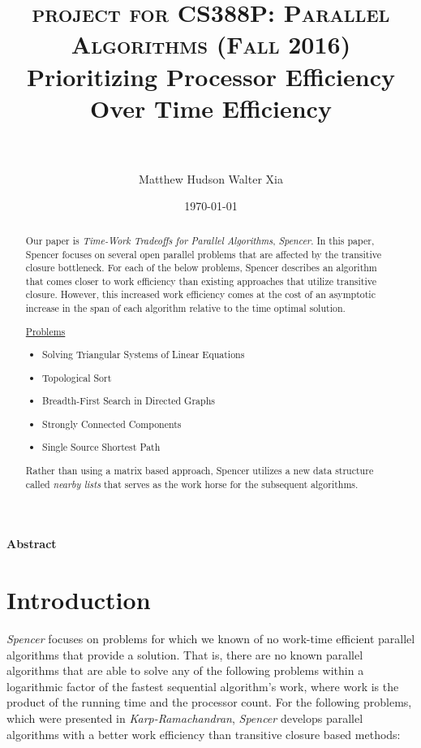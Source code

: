 \documentclass[paper=a4, fontsize=11pt]{scrartcl} %
\title{	
\normalfont \normalsize 
\textsc{project for CS388P: Parallel Algorithms (Fall 2016)} 
\horrule{0.5pt} \\[0.4cm] %
\huge Prioritizing Processor Efficiency Over Time Efficiency \\ %
\horrule{2pt} \\[0.5cm] %
}
\author{Matthew Hudson \hspace{5mm} Walter Xia }	%
\date{\normalsize\today} %
\numberwithin{equation}{section} %
\numberwithin{figure}{section} %
\numberwithin{table}{section} %
\begin{document}
\maketitle %

\justify
\textbf{Abstract}

\begin{abstract}
Our paper is \textit{Time-Work Tradeoffs for Parallel Algorithms}, \textit{Spencer\cite{S97}}. In this paper, Spencer focuses on several open parallel problems that are affected by the transitive closure bottleneck. For each of the below problems, Spencer describes an algorithm that comes closer to work efficiency than existing approaches that utilize transitive closure. However, this increased work efficiency comes at the cost of an asymptotic increase in the span of each algorithm relative to the time optimal solution.  

\underline{Problems}
\begin{itemize}
\item Solving Triangular Systems of Linear Equations
\item Topological Sort
\item Breadth-First Search in Directed Graphs
\item Strongly Connected Components
\item Single Source Shortest Path
\end{itemize}

Rather than using a matrix based approach, Spencer utilizes a new data structure called \textit{nearby lists} that serves as the work horse for the subsequent algorithms. \\
\end{abstract}


\section{Introduction}

\textit{Spencer\cite{S97}} focuses on problems for which we known of no work-time efficient parallel algorithms that provide a solution. That is, there are no known parallel algorithms that are able to solve any of the following problems within a logarithmic factor of the fastest sequential algorithm's work, where work is the product of the running time and the processor count. For the following problems, which were presented in \textit{Karp-Ramachandran\cite{KR90}}, \textit{Spencer\cite{S97}} develops parallel algorithms with a better work efficiency than transitive closure based methods: 
\end{document}
